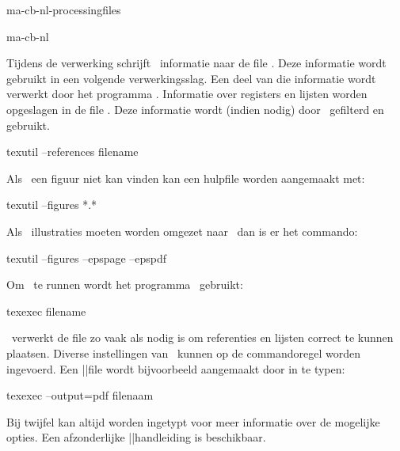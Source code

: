 \startonderdeel ma-cb-nl-processingfiles

\produkt ma-cb-nl


\index[texutil]{\TEXUTIL}

Tijdens de verwerking schrijft \CONTEXT\ informatie
naar de file . Deze informatie wordt
gebruikt in een volgende verwerkingsslag. Een deel van die
informatie wordt verwerkt door het programma \TEXUTIL.
Informatie over registers en lijsten worden opgeslagen in de
file . Deze informatie wordt (indien nodig)
door \CONTEXT\ gefilterd en gebruikt.

\starttypen
texutil --references filename
\stoptypen

Als \CONTEXT\ een figuur niet kan vinden kan een hulpfile
worden aangemaakt met:

\starttypen
texutil --figures *.*
\stoptypen

Als \EPS\ illustraties moeten worden omgezet naar \PDF\ dan
is er het commando:

\starttypen
texutil --figures --epspage --epspdf
\stoptypen

Om \CONTEXT\ te runnen wordt het programma \TEXEXEC\
gebruikt:

\starttypen
texexec filename
\stoptypen

\TEXEXEC\ verwerkt de file zo vaak als nodig is om
referenties en lijsten correct te kunnen plaatsen. Diverse
instellingen van \CONTEXT\ kunnen op de commandoregel worden
ingevoerd. Een \PDF||file wordt bijvoorbeeld aangemaakt door
in te typen:

\starttypen
texexec --output=pdf filenaam
\stoptypen

Bij twijfel kan altijd  worden ingetypt
voor meer informatie over de mogelijke opties. Een
afzonderlijke \TEXEXEC||handleiding is beschikbaar.

\stoponderdeel
